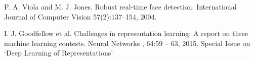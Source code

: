 \documentclass[twoside]{article}
\begin{document}
\begin{multicols}{2}
\begin{thebibliography}{9}

  	P. A. Viola and M. J. Jones. Robust real-time face detection.
	International Journal of Computer Vision
	57(2):137–154, 2004.

	I. J. Goodfellow et al.
	Challenges in representation learning: A report on three machine
	learning contests.
	Neural Networks
	, 64:59 – 63, 2015.
	Special Issue on ‘Deep Learning of Representations’
	
    

 
\end{thebibliography}


\end{multicols}
\end{document}
